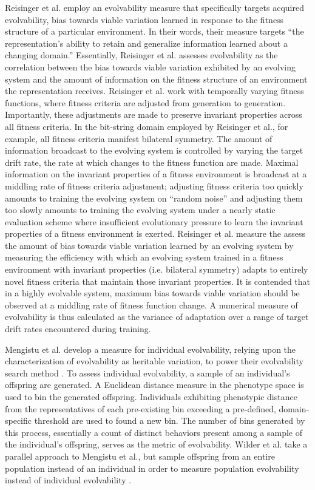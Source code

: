 Reisinger et al. employ an evolvability measure that specifically targets acquired evolvability, bias towards viable variation learned in response to the fitness structure of a particular environment\cite{Reisinger2005TowardsEvolvability}. In their words, their measure targets ``the representation’s ability to retain and generalize information learned about a changing domain.'' Essentially, Reisinger et al. assesses evolvability as the correlation between the bias towards viable variation exhibited by an evolving system and the amount of information on the fitness structure of an environment the representation receives. Reisinger et al. work with temporally varying fitness functions, where fitness criteria are adjusted from generation to generation. Importantly, these adjustments are made to preserve invariant properties across all fitness criteria. In the bit-string domain employed by Reisinger et al., for example, all fitness criteria manifest bilateral symmetry. The amount of information broadcast to the evolving system is controlled by varying the target drift rate, the rate at which changes to the fitness function are made. Maximal information on the invariant properties of a fitness environment is broadcast at a middling rate of fitness criteria adjustment; adjusting fitness criteria too quickly amounts to training the evolving system on ``random noise'' and adjusting them too slowly amounts to training the evolving system under a nearly static evaluation scheme where insufficient evolutionary pressure to learn the invariant properties of a fitness environment is exerted. Reisinger et al. measure the assess the amount of bias towards viable variation learned by an evolving system by measuring the efficiency with which an evolving system trained in a fitness environment with invariant properties (i.e. bilateral symmetry) adapts to entirely novel fitness criteria that maintain those invariant properties. It is contended that in a highly evolvable system, maximum bias towards viable variation should be observed at a middling rate of fitness function change. A numerical measure of evolvability is thus calculated as the variance of adaptation over a range of target drift rates encountered during training.

Mengistu et al. develop a measure for individual evolvability, relying upon the characterization of evolvability as heritable variation, to power their evolvability search method \cite{Mengistu2016EvolvabilityIt}. To assess individual evolvability, a sample of an individual's offspring are generated. A Euclidean distance measure in the phenotype space is used to bin the generated offspring. Individuals exhibiting phenotypic distance from the representatives of each pre-existing bin exceeding a pre-defined, domain-specific threshold are used to found a new bin. The number of bins generated by this process, essentially a count of distinct behaviors present among a sample of the individual's offspring, serves as the metric of evolvability. Wilder et al. take a parallel approach to Mengistu et al., but sample offspring from an entire population instead of an individual in order to measure population evolvability instead of individual evolvability \cite{Wilder2015ReconcilingEvolvability}.

